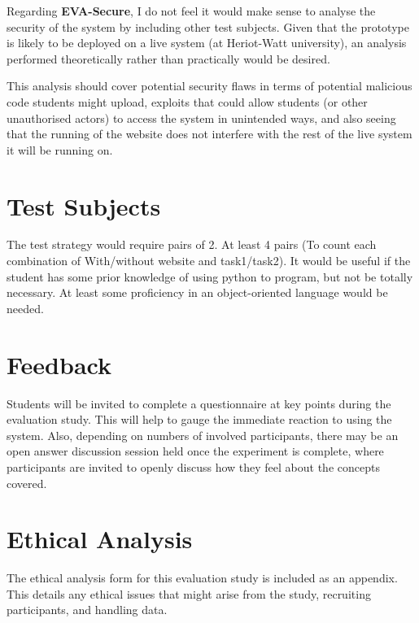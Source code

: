 \documentclass[a4paper,11pt]{report}
\begin{document}
Regarding \textbf{EVA-Secure}, I do not feel it would make sense to analyse the security of the system by including other test subjects. Given that the prototype is likely to be deployed on a live system (at Heriot-Watt university), an analysis performed theoretically rather than practically would be desired.\par
This analysis should cover potential security flaws in terms of potential malicious code students might upload, exploits that could allow students (or other unauthorised actors) to access the system in unintended ways, and also seeing that the running of the website does not interfere with the rest of the live system it will be running on.

\section{Test Subjects}
The test strategy would require pairs of 2. At least 4 pairs (To count each combination of With/without website and task1/task2). It would be useful if the student has some prior knowledge of using python to program, but not be totally necessary. At least some proficiency in an object-oriented language would be needed.

\section{Feedback}
Students will be invited to complete a questionnaire at key points during the evaluation study. This will help to gauge the immediate reaction to using the system. Also, depending on numbers of involved participants, there may be an open answer discussion session held once the experiment is complete, where participants are invited to openly discuss how they feel about the concepts covered.

\section{Ethical Analysis}
The ethical analysis form for this evaluation study is included as an appendix. This details any ethical issues that might arise from the study, recruiting participants, and handling data.


\end{document}
